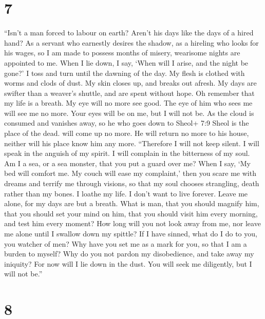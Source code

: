 \hypertarget{section-5}{%
\section{7}\label{section-5}}

 ``Isn't a man forced to labour on earth? Aren't his days
like the days of a hired hand?  As a servant who earnestly
desires the shadow, as a hireling who looks for his wages, 
so I am made to possess months of misery, wearisome nights are appointed
to me.  When I lie down, I say, `When will I arise, and the
night be gone?' I toss and turn until the dawning of the day.
 My flesh is clothed with worms and clods of dust. My skin
closes up, and breaks out afresh.  My days are swifter than
a weaver's shuttle, and are spent without hope.  Oh remember
that my life is a breath. My eye will no more see good.  The
eye of him who sees me will see me no more. Your eyes will be on me, but
I will not be.  As the cloud is consumed and vanishes away,
so he who goes down to Sheol+ 7:9 Sheol is the place of the dead. will
come up no more.  He will return no more to his house,
neither will his place know him any more.  ``Therefore I
will not keep silent. I will speak in the anguish of my spirit. I will
complain in the bitterness of my soul.  Am I a sea, or a
sea monster, that you put a guard over me?  When I say, `My
bed will comfort me. My couch will ease my complaint,' 
then you scare me with dreams and terrify me through visions,
 so that my soul chooses strangling, death rather than my
bones.  I loathe my life. I don't want to live forever.
Leave me alone, for my days are but a breath.  What is man,
that you should magnify him, that you should set your mind on him,
 that you should visit him every morning, and test him
every moment?  How long will you not look away from me, nor
leave me alone until I swallow down my spittle?  If I have
sinned, what do I do to you, you watcher of men? Why have you set me as
a mark for you, so that I am a burden to myself?  Why do
you not pardon my disobedience, and take away my iniquity? For now will
I lie down in the dust. You will seek me diligently, but I will not
be.''

\hypertarget{section-6}{%
\section{8}\label{section-6}}

